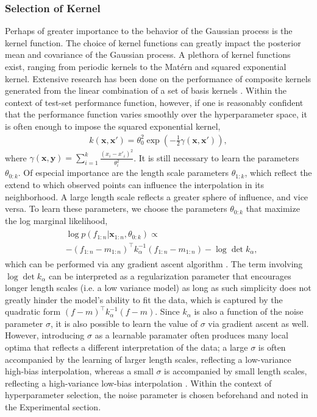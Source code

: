 \documentclass{article}
\newcommand{\x}{\mathbf{x}}
\newcommand{\y}{\mathbf{y}}
\newcommand{\paren}[1]{\left({#1}\right)}
\begin{document}
\subsubsection{Selection of Kernel}
Perhaps of greater importance to the behavior of the Gaussian process is the kernel function. The choice of kernel functions can greatly impact the posterior mean and covariance of the Gaussian process. A plethora of kernel functions exist, ranging from periodic kernels to the Mat\'{e}rn and squared exponential kernel. Extensive research has been done on the performance of composite kernels generated from the linear combination of a set of basis kernels \cite{kernel}. Within the context of test-set performance function, however, if one is reasonably confident that the performance function varies smoothly over the hyperparameter space, it is often enough to impose the squared exponential kernel,
\begin{align}
  k(\x, \x') = \theta_0^2\exp\paren{-\frac{1}{2} \gamma\paren{\x, \x'}},
\end{align}
where $\gamma\paren{\x,\y}=\sum_{i=1}^k \frac{\paren{x_i-x'_i}^2}{\theta_i^2}$. It is still necessary to learn the parameters $\theta_{0:k}$. Of especial importance are the length scale parameters $\theta_{1:k}$, which reflect the extend to which observed points can influence the interpolation in its neighborhood. A large length scale reflects a greater sphere of influence, and vice versa. To learn these parameters, we choose the parameters $\theta_{0:k}$ that maximize the log marginal likelihood,
\begin{align}
  \begin{split}
    &\log p \left(f_{1:n} \vert \x_{1:n}, \theta_{0:k}\right) \propto \\
    &-(f_{1:n} - m_{1:n})^\top k_\alpha^{-1}(f_{1:n} - m_{1:n}) - \log \det k_\alpha,
  \end{split}
\end{align}
which can be performed via any gradient ascent algorithm \cite{rasmussen:lecture}. The term involving $\log \det k_\alpha$ can be interpreted as a regularization parameter that encourages longer length scales (i.e. a low variance model) as long as such simplicity does not greatly hinder the model's ability to fit the data, which is captured by the quadratic form $(f-m)^\top k_\alpha^{-1}(f-m)$. Since $k_\alpha$ is also a function of the noise parameter $\sigma$, it is also possible to learn the value of $\sigma$ via gradient ascent as well. However, introducing $\sigma$ as a learnable paramater often produces many local optima that reflects a different interpretation of the data; a large $\sigma$ is often accompanied by the learning of larger length scales, reflecting a low-variance high-bias interpolation, whereas a small $\sigma$ is accompanied by small length scales, reflecting a high-variance low-bias interpolation \cite{rasmussen:book}. Within the context of hyperparameter selection, the noise parameter is chosen beforehand and noted in the Experimental section.
\end{document}
